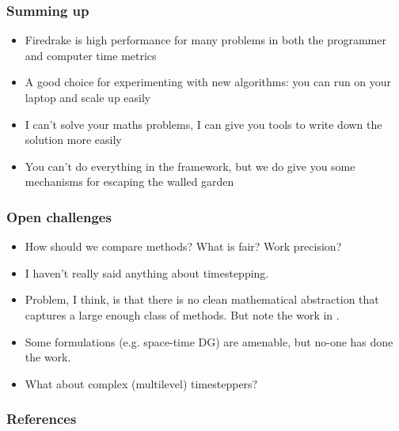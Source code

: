 \documentclass[presentation]{beamer}
\begin{document}
\begin{frame}
  \frametitle{Summing up}
  \begin{itemize}
  \item Firedrake is high performance for many problems in both
    the programmer and computer time metrics
  \item A good choice for experimenting with new algorithms: you can
    run on your laptop and scale up easily
  \item I can't solve your maths problems, I can give you tools to
    write down the solution more easily
  \item You can't do everything in the framework, but we do give you
    some mechanisms for escaping the walled garden
  \end{itemize}
\end{frame}
\begin{frame}
  \frametitle{Open challenges}
  \begin{itemize}
  \item How should we compare methods?  What is fair? Work precision?

  \item I haven't really said anything about timestepping.

  \item Problem, I think, is that there is no clean mathematical
    abstraction that captures a large enough class of methods.  But
    note the work in \textcite{Maddison:2014}.

  \item Some formulations (e.g. space-time DG) are amenable, but
    no-one has done the work.

  \item What about complex (multilevel) timesteppers?
  \end{itemize}
\end{frame}


\appendix
\begin{frame}[t,allowframebreaks]
  \frametitle{References}
  \printbibliography[heading=none]
\end{frame}
\end{document}
